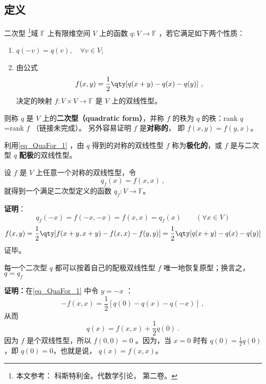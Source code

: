 
\subsection{定义}
\begin{definition}{二次型}\label{def_QuaFor_2}
\footnote{本文参考： 科斯特利金。代数学引论， 第二卷。}域 $\mathbb{F}$ 上有限维空间 $V$ 上的函数 $q:V\rightarrow\mathbb{F}$ ，若它满足如下两个性质：
\begin{enumerate}
\item $q(-{v})=q( v),\quad \forall v\in V$;
\item 由公式
\begin{equation}\label{eq_QuaFor_1}
f(x, y)=\frac{1}{2}\qty[q(x+ y)-q(x)-q(y)]~,
\end{equation}
决定的映射 $f:V\times V\rightarrow\mathbb{F}$ 是 $V$ 上的双线性型。
\end{enumerate}
则称 $q$ 是 $V$ 上的\textbf{二次型（quadratic form）}，并称 $f$ 的秩为 $q$ 的秩：rank $q$=rank $f$ （链接未完成）。 另外容易证明 $f$ 是\textbf{对称的}， 即 $f(x,y) = f(y,x)$。
\end{definition}
利用\autoref{eq_QuaFor_1} ，由 $q$ 得到的对称的双线性型 $f$ 称为\textbf{极化的}，或 $f$ 是与二次型 $q$ \textbf{配极}的双线性型。
\begin{example}{}
设 $f$ 是 $V$ 上任意一个对称的双线性型，令
\begin{equation}
q_f( x)=f( x, x)~,
\end{equation}
就得到一个满足二次型定义的函数 $q_f:V\rightarrow\mathbb{F}$。

\textbf{证明}：
\begin{equation}
q_f(-{x})=f(-{x},-{x})=f({x},{x})=q_f({x}) \qquad (\forall x\in V)
\end{equation}
\begin{equation}
f(x, y)=\frac{1}{2}\qty[f( x+ y, x+ y)-f( x, x)-f( y, y)]
=\frac{1}{2}\qty[q(x+ y)-q(x)-q(y)]
\end{equation}
证毕。
\end{example}

\begin{theorem}{}\label{the_QuaFor_1}
每一个二次型 $q$ 都可以按着自己的配极双线性型 $f$ 唯一地恢复原型；换言之， $q=q_f$
\end{theorem}
\textbf{证明：}在\autoref{eq_QuaFor_1} 中令 $y=-x$ ：
\begin{equation}
-f(x,x)=\frac{1}{2}[q(0)-q(x)-q(-x)]~,
\end{equation}
从而
\begin{equation}
q(x)=f(x,x)+\frac{1}{2}q(0)~.
\end{equation}
因为 $f$ 是个双线性型，所以 $f(0,0)=0$ 。因为，当 $x=0$ 时有 $q(0)=\frac{1}{2}q(0)$ ，即 $q(0)=0$，也就是说， $q(x)=f(x,x)$。

